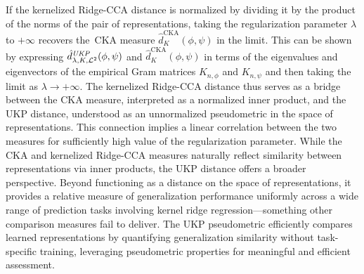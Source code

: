\documentclass{article} %
\newcommand{\repone}{\phi}
\newcommand{\reptwo}{\psi}
\newcommand{\metricstname}{UKP }
\newcommand{\dtwohat}{\hat{d}_{\lambda,K,\mathcal{L}^{2}}^{\emph{\metricstname}}}
\theoremstyle{plain}
\begin{document}
If the kernelized Ridge-CCA distance is normalized by dividing it by the product of the norms of the pair of representations, taking the regularization parameter $\lambda$ to $+\infty$ recovers the CKA measure $\hat{d}_{K}^{\text{CKA}}(\repone,\reptwo)$ in the limit. This can be shown by expressing $\dtwohat(\repone,\reptwo)$ and $\hat{d}_{K}^{\text{CKA}}(\repone,\reptwo)$ in terms of the eigenvalues and eigenvectors of the empirical Gram matrices $K_{n,\repone}$ and $K_{n,\reptwo}$ and then taking the limit as $\lambda \to +\infty$. The kernelized Ridge-CCA distance thus serves as a bridge between the CKA measure, interpreted as a normalized inner product, and the \metricstname distance, understood as an unnormalized pseudometric in the space of representations. This connection implies a linear correlation between the two measures for sufficiently high value of the regularization parameter. While the CKA and kernelized Ridge-CCA measures naturally reflect similarity between representations via inner products, the \metricstname distance offers a broader perspective. Beyond functioning as a distance on the space of representations, it provides a relative measure of generalization performance uniformly across a wide range of prediction tasks involving kernel ridge regression—something other comparison measures fail to deliver. The \metricstname pseudometric efficiently compares learned representations by quantifying generalization similarity without task-specific training, leveraging pseudometric properties for meaningful and efficient assessment.


\end{document}
